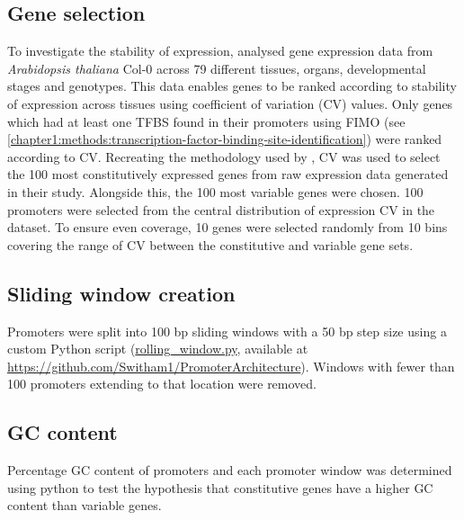 \documentclass[../main.tex]{subfiles}
\begin{document}
\subsection{Gene selection}\label{chapter1:methods:gene-selection}

To investigate the stability of expression, \textcite*{czechowskiGenomeWideIdentificationTesting2005} analysed gene expression data from \textit{Arabidopsis thaliana} Col-0 across 79 different tissues, organs, developmental stages and genotypes.
This data enables genes to be ranked according to stability of expression across tissues using coefficient of variation (CV) values.
Only genes which had at least one TFBS found in their promoters using FIMO (see \autoref{chapter1:methods:transcription-factor-binding-site-identification}) were ranked according to CV.
Recreating the methodology used by \textcite*{czechowskiGenomeWideIdentificationTesting2005}, CV was used to select the 100 most constitutively expressed genes from raw expression data generated in their study.
Alongside this, the 100 most variable genes were chosen.
100 promoters were selected from the central distribution of expression CV in the \textcite*{czechowskiGenomeWideIdentificationTesting2005} dataset.
To ensure even coverage, 10 genes were selected randomly from 10 bins covering the range of CV between the constitutive and variable gene sets.


\subsection{Sliding window creation}
\label{chapter1:methods:sliding-window-creation}
Promoters were split into 100 bp sliding windows with a 50 bp step size using a custom Python script (\href{https://github.com/Switham1/PromoterArchitecture/blob/master/src/rolling_window/rolling_window.py}{rolling\_window.py}, available at \url{https://github.com/Switham1/PromoterArchitecture}).
Windows with fewer than 100 promoters extending to that location were removed.

\subsection{GC content}
{\label{chapter1:methods:gc-content}}

Percentage GC content of promoters and each promoter window was determined using python to test the hypothesis that constitutive genes have a higher GC content than variable genes.
\end{document}

